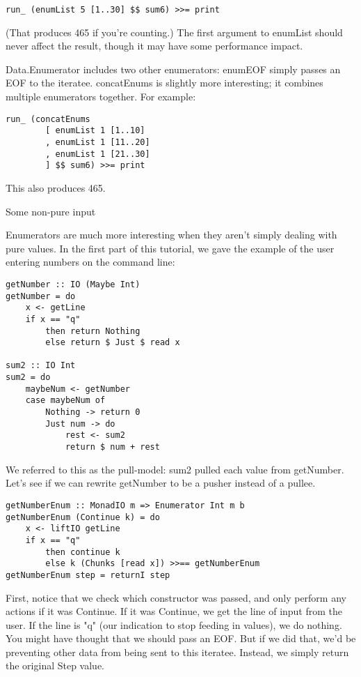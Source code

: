 \begin{lstlisting}
run_ (enumList 5 [1..30] $$ sum6) >>= print
\end{lstlisting}

(That produces 465 if you're counting.) The first argument to enumList should never affect the result, though it may have some performance impact.

Data.Enumerator includes two other enumerators: enumEOF simply passes an EOF to the iteratee. concatEnums is slightly more interesting; it combines multiple enumerators together. For example:

\begin{lstlisting}
run_ (concatEnums
        [ enumList 1 [1..10]
        , enumList 1 [11..20]
        , enumList 1 [21..30]
        ] $$ sum6) >>= print
\end{lstlisting}

This also produces 465.

Some non-pure input

Enumerators are much more interesting when they aren't simply dealing with pure values. In the first part of this tutorial, we gave the example of the user entering numbers on the command line:

\begin{lstlisting}
getNumber :: IO (Maybe Int)
getNumber = do
    x <- getLine
    if x == "q"
        then return Nothing
        else return $ Just $ read x

sum2 :: IO Int
sum2 = do
    maybeNum <- getNumber
    case maybeNum of
        Nothing -> return 0
        Just num -> do
            rest <- sum2
            return $ num + rest
\end{lstlisting}

We referred to this as the pull-model: sum2 pulled each value from getNumber. Let's see if we can rewrite getNumber to be a pusher instead of a pullee.

\begin{lstlisting}
getNumberEnum :: MonadIO m => Enumerator Int m b
getNumberEnum (Continue k) = do
    x <- liftIO getLine
    if x == "q"
        then continue k
        else k (Chunks [read x]) >>== getNumberEnum
getNumberEnum step = returnI step
\end{lstlisting}

First, notice that we check which constructor was passed, and only perform any actions if it was Continue. If it was Continue, we get the line of input from the user. If the line is "q" (our indication to stop feeding in values), we do nothing. You might have thought that we should pass an EOF. But if we did that, we'd be preventing other data from being sent to this iteratee. Instead, we simply return the original Step value.

